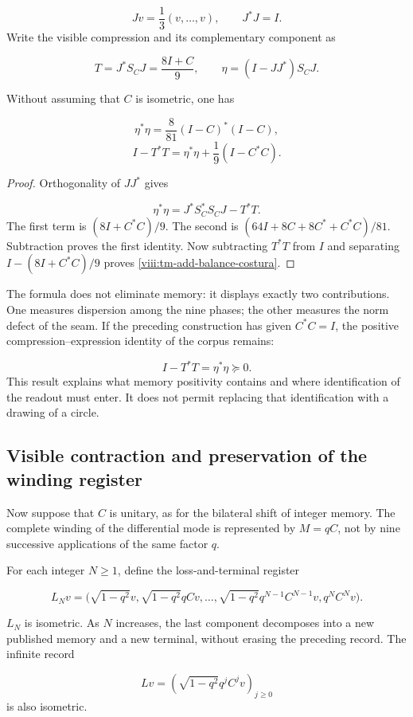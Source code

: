\[
Jv=\frac13(v,\ldots,v),\qquad J^*J=I.
\]
Write the visible compression and its complementary component as

\[
T=J^*S_CJ=\frac{8I+C}{9},\qquad
\eta=(I-JJ^*)S_CJ.
\]
\begin{proposition}
\label{viii:tm-add-proposicion-costura-1}
Without assuming that \(C\) is isometric, one has

\[
\eta^*\eta=\frac8{81}(I-C)^*(I-C),
\]
\begin{equation}
\boxed{I-T^*T=\eta^*\eta+\frac19(I-C^*C).}
\label{viii:tm-add-balance-costura}
\end{equation}
\end{proposition}

\begin{proof}
Orthogonality of \(JJ^*\) gives

\[
\eta^*\eta=J^*S_C^*S_CJ-T^*T.
\]
The first term is \((8I+C^*C)/9\). The second is \((64I+8C+8C^*+C^*C)/81\). Subtraction proves the first identity. Now subtracting \(T^*T\) from \(I\) and separating \(I-(8I+C^*C)/9\) proves \eqref{viii:tm-add-balance-costura}.
\end{proof}

The formula does not eliminate memory: it displays exactly two contributions. One measures dispersion among the nine phases; the other measures the norm defect of the seam. If the preceding construction has given \(C^*C=I\), the positive compression–expression identity of the corpus remains:

\[
I-T^*T=\eta^*\eta\succeq0.
\]
This result explains what memory positivity contains and where identification of the readout must enter. It does not permit replacing that identification with a drawing of a circle.


\subsection{Visible contraction and preservation of the winding register}
\label{viii:tm-add-c3}
Now suppose that \(C\) is unitary, as for the bilateral shift of integer memory. The complete winding of the differential mode is represented by \(M=qC\), not by nine successive applications of the same factor \(q\).

For each integer \(N\geq1\), define the loss-and-terminal register

\[
L_Nv=\bigl(\sqrt{1-q^2}v,
\sqrt{1-q^2}qCv,\ldots,
\sqrt{1-q^2}q^{N-1}C^{N-1}v, q^NC^Nv\bigr).
\]
\begin{proposition}
\label{viii:tm-add-proposicion-costura-2}
\(L_N\) is isometric. As \(N\) increases, the last component decomposes into a new published memory and a new terminal, without erasing the preceding record. The infinite record

\[
Lv=\left(\sqrt{1-q^2}q^jC^jv\right)_{j\geq0}
\]
is also isometric.
\end{proposition}

